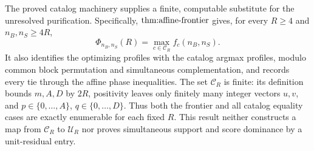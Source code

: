 The proved catalog machinery supplies a finite, computable substitute for the unresolved purification.  Specifically, \(\textnormal{thm:affine-frontier}\) gives, for every \(R\ge 4\) and \(n_B,n_S\ge 4R\),
\[
\Phi_{n_B,n_S}(R)=\max_{c\in\mathcal C_R} f_c(n_B,n_S).
\]
It also identifies the optimizing profiles with the catalog argmax profiles, modulo common block permutation and simultaneous complementation, and records every tie through the affine phase inequalities.  The set \(\mathcal C_R\) is finite: its definition bounds \(m,A,D\) by \(2R\), positivity leaves only finitely many integer vectors \(u,v\), and \(p\in\{0,\ldots,A\}\), \(q\in\{0,\ldots,D\}\).  Thus both the frontier and all catalog equality cases are exactly enumerable for each fixed \(R\).  This result neither constructs a map from \(\mathcal C_R\) to \(\mathcal U_R\) nor proves simultaneous support and score dominance by a unit-residual entry.

